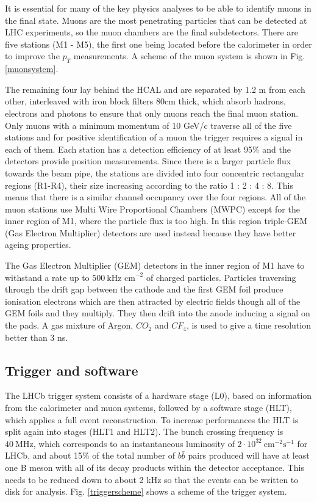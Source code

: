 It is essential for many of the key physics analyses to be able to identify muons in the final state.
Muons are the most penetrating particles that can be detected at LHC experiments, so the muon chambers
are the final subdetectors. There are five stations (M1 - M5), the first one being located before the calorimeter
in order to improve the $p_T$ measurements. A scheme of the muon system is shown in Fig. \ref{muonsystem}.

The remaining four lay behind the HCAL and are separated by 1.2 m from each other, interleaved with iron block
filters 80cm thick, which absorb hadrons, electrons and photons to ensure that only muons reach the final muon station.
Only muons with a minimum momentum of 10 GeV/c traverse all of the five stations and for positive identification of a muon
the trigger requires a signal in each of them. Each station has a detection efficiency of at least 95\% and the detectors
provide position measurements. Since there is a larger particle flux towards the beam pipe, the stations are divided
into four concentric rectangular regions (R1-R4), their size increasing according to the ratio 1 : 2 : 4 : 8.
This means that there is a similar channel occupancy over the four regions. All of the muon stations use
Multi Wire Proportional Chambers (MWPC) except for the inner region of M1, where the particle flux is too high.
In this region triple-GEM (Gas Electron Multiplier) detectors are used instead because they have better ageing properties.

The Gas Electron Multiplier (GEM) detectors in the inner region of M1 have to  withstand a rate up to
$500 ~\mbox{kHz cm}^{-2}$ of charged particles. Particles traversing through the drift gap between the cathode
and the first GEM foil produce ionisation electrons which are then attracted by electric fields though all of the
GEM foils and they multiply. They then drift into the anode inducing a signal on the pads. A gas mixture of Argon,
$CO_2$ and $CF_4$, is used to give a time resolution better than 3 ns.




\subsection{Trigger and software}

The LHCb trigger system\cite{LHCb-DP-2012-004} consists of a hardware stage (L0), based on information from the calorimeter
and muon systems, followed by a software stage (HLT), which applies a full event reconstruction. To increase performances
the HLT is split again into stages (HLT1 and HLT2). The bunch crossing frequency is $40 ~\mbox{MHz}$, which corresponds
to an instantaneous luminosity of $2 \cdot 10^{32} ~\mbox{cm}^{-2} \mbox{s}^{-1}$ for LHCb, and about 15\% of the total
number of $b\bar{b}$ pairs produced will have at least one B meson with all of its decay products within the detector acceptance.
This needs to be reduced down to about 2 kHz so that the events can be written to disk for analysis. Fig. \ref{triggerscheme}
shows a scheme of the trigger system.

